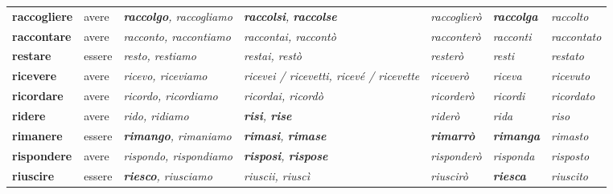 \documentclass[11pt,a4paper,twoside,openright]{book}
\newcommand{\irr}[1]{{\color{exccol}\bfseries #1}}
\begin{document}
{\begin{xltabular}{\linewidth}{@{}>{\raggedright\arraybackslash}p{2.7cm} l L L l >{\raggedright\arraybackslash}p{1.9cm} l@{}}
\textbf{raccogliere} & avere & \textit{\irr{raccolgo}, raccogliamo} & \textit{\irr{raccolsi}, \irr{raccolse}} & \textit{raccoglierò} & \textit{\irr{raccolga}} & \textit{raccolto} \\
\textbf{raccontare} & avere & \textit{racconto, raccontiamo} & \textit{raccontai, raccontò} & \textit{racconterò} & \textit{racconti} & \textit{raccontato} \\
\textbf{restare} & essere & \textit{resto, restiamo} & \textit{restai, restò} & \textit{resterò} & \textit{resti} & \textit{restato} \\
\textbf{ricevere} & avere & \textit{ricevo, riceviamo} & \textit{ricevei / ricevetti, ricevé / ricevette} & \textit{riceverò} & \textit{riceva} & \textit{ricevuto} \\
\textbf{ricordare} & avere & \textit{ricordo, ricordiamo} & \textit{ricordai, ricordò} & \textit{ricorderò} & \textit{ricordi} & \textit{ricordato} \\
\textbf{ridere} & avere & \textit{rido, ridiamo} & \textit{\irr{risi}, \irr{rise}} & \textit{riderò} & \textit{rida} & \textit{riso} \\
\textbf{rimanere} & essere & \textit{\irr{rimango}, rimaniamo} & \textit{\irr{rimasi}, \irr{rimase}} & \textit{\irr{rimarrò}} & \textit{\irr{rimanga}} & \textit{rimasto} \\
\textbf{rispondere} & avere & \textit{rispondo, rispondiamo} & \textit{\irr{risposi}, \irr{rispose}} & \textit{risponderò} & \textit{risponda} & \textit{risposto} \\
\textbf{riuscire} & essere & \textit{\irr{riesco}, riusciamo} & \textit{riuscii, riuscì} & \textit{riuscirò} & \textit{\irr{riesca}} & \textit{riuscito} \\

\end{xltabular}}
\end{document}
